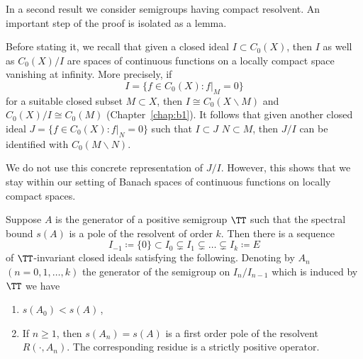 In a second result we consider semigroups having compact resolvent.
An important step of the proof is isolated as a lemma.

Before stating it, we recall that given a closed ideal $I \subset C_{0}(X)$, then $I$ as well as $C_{0}(X)/I$ are spaces of continuous functions on a locally compact space vanishing at infinity.
More precisely, if 
\[
I = \{f \in C_{0}(X) \colon f|_{M} = 0\}
\]
for a suitable closed subset $M \subset X$, then $I \cong C_{0}(X\backslash M)$ and $C_{0}(X)/I \cong C_{0}(M)$ (\cf Chapter~\ref{chap:b1}).
It follows that given another closed ideal $J = \{f \in C_{0}(X) \colon f|_{N} = 0\}$ such that $I \subset J$ \ie $N \subset M$, then $J/I$ can be identified with $C_{0}(M\backslash N)$.

We do not use this concrete representation of\/ $J/I$.
However, this shows that we stay within our setting of Banach spaces of continuous functions on locally compact spaces.
\begin{lemma}\label{lem:b3-2.8}
Suppose $A$ is the generator of a positive semigroup $\TT$ such that the spectral bound $s(A)$ is a pole of the resolvent%
of order $k$.
Then there is a sequence
\begin{equation}\label{eq:b3-2.16}
    I_{-1} \coloneqq \{0\} \subset I_{0} \subsetneq I_{1} \subsetneq \ldots \subsetneq I_{k} \coloneqq E
\end{equation}
of\/ $\TT$-invariant closed ideals satisfying the following. 
Denoting by $A_{n}$ $(n = 0,1,\ldots,k)$ the generator of the semigroup on $I_{n}/I_{n-1}$ which is induced by $\TT$ we have
\begin{enumerate}[\upshape (i)]
    \item 
    $s(A_{0}) < s(A)$\,,
    
    \item 
    If\/ $n \geq 1$, then $s(A_{n}) = s(A)$ is a first order pole of the resolvent $R(\cdot,A_{n})$. 
    The corresponding residue is a strictly positive operator.
\end{enumerate}
\end{lemma}
